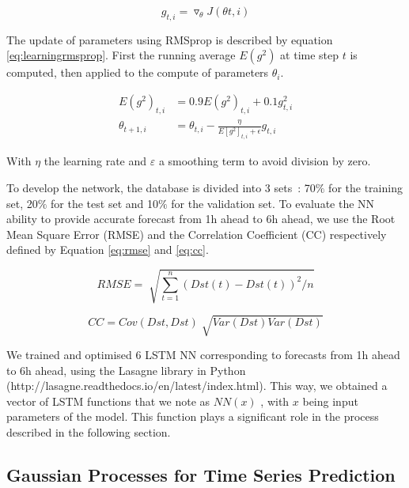 \begin{equation}\label{eq:gradient}
 g_{t,i} = \triangledown_{ \theta } J \left(  \theta t,i \right)
\end{equation}

The update of parameters using RMSprop is described by equation \ref{eq:learningrmsprop}. First the running average  
\( E \left( g^{2} \right)  \)  at time step  \( t \)  is computed, then applied to the compute 
of parameters  \(  \theta _{i} \).


\begin{align}\label{eq:learningrmsprop}
 E \left( g^{2} \right)_{t,i} &= 0.9E \left( g^{2} \right)_{t,i} + 0.1 g_{t,i}^{2}  \\ 
 \theta _{t+1,i} &= \theta _{t,i} - \frac{ \eta }{E \left[ g^{2} \right]_{t,i}+ \epsilon } g_{t,i}
\end{align}

With  \(  \eta   \) the learning rate and  \(  \varepsilon  \)  a smoothing term to avoid division by zero.

To develop the network, the database is divided into 3 sets : 70$\%$  for the training set, 20$\%$  
for the test set and 10$\%$  for the validation set. To evaluate the NN ability to provide accurate 
forecast from 1h ahead to 6h ahead, we use the Root Mean Square Error (RMSE) and the Correlation Coefficient (CC) 
respectively defined by Equation \ref{eq:rmse} and \ref{eq:cc}. 


\begin{equation}\label{eq:rmse}
 RMSE= \sqrt[]{ \sum _{t=1}^{n} \left( Dst \left( t \right) -Dst \left( t \right)  \right) ^{2}/n}
\end{equation}

\begin{equation}\label{eq:cc}
 CC=Cov \left( Dst,Dst \right) \sqrt[]{Var \left( Dst \right) Var \left( Dst \right) }
\end{equation}


We trained and optimised 6 LSTM NN corresponding to forecasts from 1h ahead to 6h ahead, using the 
Lasagne library in Python (http://lasagne.readthedocs.io/en/latest/index.html). This way, we obtained a 
vector of LSTM functions that we note as  \( NN \left( x \right)  \) , with  \( x \)  being input parameters 
of the model. This function plays a significant role in the process described in the following section. 


\subsection{Gaussian Processes for Time Series Prediction}

